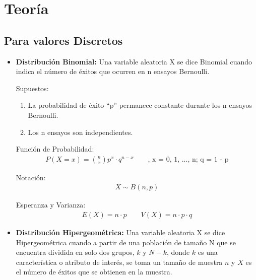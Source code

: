 \documentclass{templateNote}
\begin{document}
\portada
\margenes %

\section{Teoría}
\subsection*{Para valores Discretos}
\begin{itemize}
  \item \textbf{Distribución Binomial:} Una variable aleatoria X se dice Binomial cuando indica el número de éxitos que
  ocurren en n ensayos Bernoulli.

  Supuestos:
  \begin{enumerate}
    \item La probabilidad de éxito “p” permanece constante durante los n ensayos Bernoulli.
    \item Los n ensayos son independientes.
  \end{enumerate}

  Función de Probabilidad:
  \begin{align*}
    P(X=x) = \binom{n}{x} p^x \cdot q^{n-x} \qquad \text{, x = 0, 1, ..., n; q = 1 - p}
  \end{align*}

  Notación:
  \begin{align*}
    X \sim B(n, p)
  \end{align*}

  Esperanza y Varianza:
  \begin{align*}
    E(X) = n \cdot p \qquad V(X) = n \cdot p \cdot q
  \end{align*}

  \item \textbf{Distribución Hipergeométrica:} Una variable aleatoria X se dice Hipergeométrica cuando a partir de una población
  de tamaño N que se encuentra dividida en solo dos grupos, $k$ y $N - k$, donde $k$ es una
  característica o atributo de interés, se toma un tamaño de muestra $n$ y $X$ es el número de éxitos
  que se obtienen en la muestra.


\end{itemize}
\end{document}
